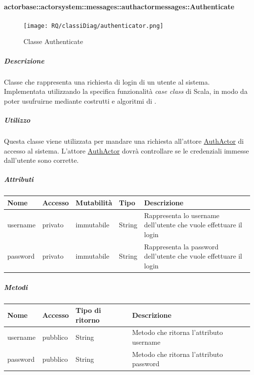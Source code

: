 \documentclass{scalatekids-article}
\begin{document}
\paragraph{actorbase::actorsystem::messages::authactormessages::Authenticate}
\label{sec:actorbase::actorsystem::messages::authactormessages::Authenticate}

\begin{figure}[H]
  \begin{center}
    \texttt{[image: RQ/classiDiag/authenticator.png]}
    \caption{Classe Authenticate}
  \end{center}
\end{figure}

\subparagraph{Descrizione}
Classe che rappresenta una richiesta di login di un utente al sistema.\\Implementata utilizzando la specifica funzionalità \textit{case class} di Scala,
in modo da poter usufruirne mediante costrutti e algoritmi di
.

\subparagraph{Utilizzo}
Questa classe viene utilizzata per mandare una richiesta all'attore
\hyperref[sec:actorbase::actorsystem::actors::authactor::AuthActor]{AuthActor}
di accesso al sistema. L'attore \hyperref[sec:actorbase::actorsystem::actors::authactor::AuthActor]{AuthActor}
dovrà controllare se le credenziali immesse dall'utente sono corrette.

\subparagraph{Attributi}
\begin{tabular}{| p{2cm} | p{1.5cm} | p{2cm} | p{3cm} | p{8.5cm} |}
  \hline
  Nome & Accesso & Mutabilità & Tipo & Descrizione\\
  \hline
  username & privato & immutabile & String & Rappresenta lo username dell'utente che vuole effettuare il login \\
  \hline
  password & privato & immutabile & String & Rappresenta la password dell'utente che vuole effettuare il login \\
  \hline
\end{tabular}

\subparagraph{Metodi}
\begin{tabular}{| l | l | l | l |}
  \hline
  Nome & Accesso & Tipo di ritorno & Descrizione\\
  \hline
  username & pubblico & String & Metodo che ritorna l'attributo username\\
  \hline
  password & pubblico & String & Metodo che ritorna l'attributo password\\
  \hline
\end{tabular}
\end{document}
